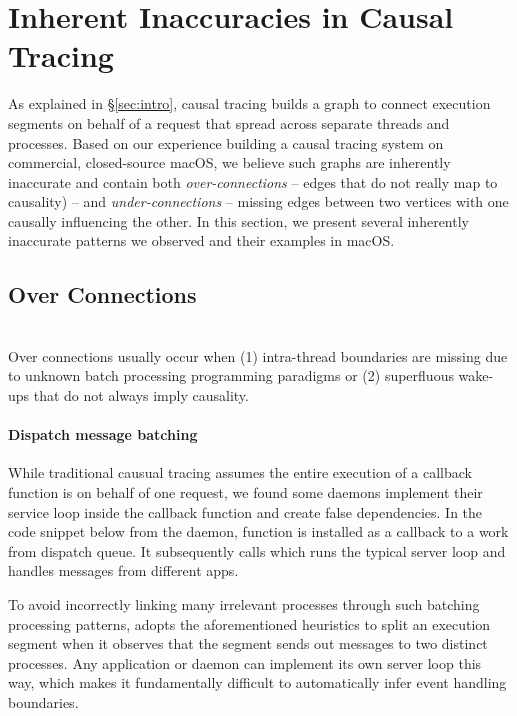 \section{Inherent Inaccuracies in Causal Tracing}\label{sec:inaccuracy}

As explained in \S\ref{sec:intro}, causal tracing builds a graph to
connect execution segments on behalf of a request that spread across
separate threads and processes.  Based on our experience building a causal
tracing system on commercial, closed-source macOS, we believe such graphs
are inherently inaccurate and contain both \emph{over-connections} --
edges that do not really map to causality) -- and \emph{under-connections}
-- missing edges between two vertices with one causally influencing the
other.  In this section, we present several inherently inaccurate patterns
we observed and their examples in macOS.


\subsection{Over Connections}\hfill\\

Over connections usually occur when (1) intra-thread boundaries are
missing due to unknown batch processing programming paradigms or (2)
superfluous wake-ups that do not always imply causality.

\paragraph{Dispatch message batching}

While traditional causual tracing assumes the entire execution of a callback
function is on behalf of one request, we found some daemons implement their
service loop inside the callback function and create false dependencies. In the
code snippet below from the  daemon, function 
is installed as a callback to a work from dispatch queue. It subsequently calls
 which runs the typical server loop and handles
messages from different apps.

To avoid incorrectly linking many irrelevant processes through such batching
processing patterns, \xxx adopts the aforementioned heuristics to split an
execution segment when it observes that the segment sends out messages to two
distinct processes. Any application or daemon can implement its own server loop
this way, which makes it fundamentally difficult to automatically infer event
handling boundaries.


